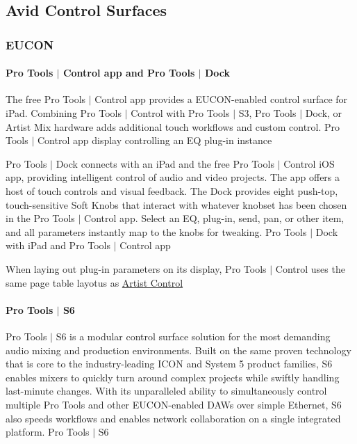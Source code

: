  \hypertarget{a00363_aax_page_table_guide_02_avid_control_surfaces}{}\subsection{Avid Control Surfaces}\label{a00363_aax_page_table_guide_02_avid_control_surfaces}
\hypertarget{a00363_subsection__eucon}{}\subsubsection{E\+U\+C\+O\+N}\label{a00363_subsection__eucon}
\hypertarget{a00363_subsubsection__avid_ptcontrol}{}\paragraph{Pro Tools $\vert$ Control app and Pro Tools $\vert$ Dock}\label{a00363_subsubsection__avid_ptcontrol}
The free Pro Tools $\vert$ Control app provides a E\+U\+C\+O\+N-\/enabled control surface for i\+Pad. Combining Pro Tools $\vert$ Control with Pro Tools $\vert$ S3, Pro Tools $\vert$ Dock, or Artist Mix hardware adds additional touch workflows and custom control.   Pro Tools $\vert$ Control app display controlling an E\+Q plug-\/in instance 

Pro Tools $\vert$ Dock connects with an i\+Pad and the free Pro Tools $\vert$ Control i\+O\+S app, providing intelligent control of audio and video projects. The app offers a host of touch controls and visual feedback. The Dock provides eight push-\/top, touch-\/sensitive Soft Knobs that interact with whatever knobset has been chosen in the Pro Tools $\vert$ Control app. Select an E\+Q, plug-\/in, send, pan, or other item, and all parameters instantly map to the knobs for tweaking.   Pro Tools $\vert$ Dock with i\+Pad and Pro Tools $\vert$ Control app 

When laying out plug-\/in parameters on its display, Pro Tools $\vert$ Control uses the same page table layotus as \hyperlink{a00363_subsubsection__avid_artist_series_mc_control_v2_}{Artist Control}

\hypertarget{a00363_subsubsection__avid_s6}{}\paragraph{Pro Tools $\vert$ S6}\label{a00363_subsubsection__avid_s6}
Pro Tools $\vert$ S6 is a modular control surface solution for the most demanding audio mixing and production environments. Built on the same proven technology that is core to the industry-\/leading I\+C\+O\+N and System 5 product families, S6 enables mixers to quickly turn around complex projects while swiftly handling last-\/minute changes. With its unparalleled ability to simultaneously control multiple Pro Tools and other E\+U\+C\+O\+N-\/enabled D\+A\+Ws over simple Ethernet, S6 also speeds workflows and enables network collaboration on a single integrated platform.   Pro Tools $\vert$ S6 

